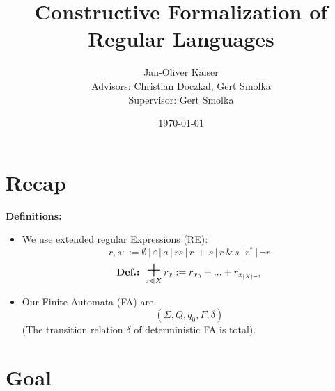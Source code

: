 \documentclass{beamer}
\DeclareMathOperator*{\bigplus}{\mbox{\huge +}}
\begin{document}
\title{Constructive Formalization of Regular Languages}  
\author[Jan-Oliver Kaiser]{Jan-Oliver Kaiser \\{\small Advisors: Christian Doczkal, Gert Smolka }\\{\small Supervisor: Gert Smolka}}

\date{\today} 


\begin{frame}
    \titlepage
\end{frame}

\begin{frame}
    \tableofcontents
\end{frame}


\section*{Recap}
\begin{frame}
    \textbf{Definitions:} \\

    \begin{itemize}
        \item 
            We use extended regular Expressions (RE):
            \[    
                r, s ::= \emptyset \, | \, \varepsilon \, | \,  a \, | \, rs \, | \,  r \,  + \, s \, | \, r \, \& \, s \, |\, r^* \, | \, \neg r
            \]
            \[
            \mbox{\textbf{Def.:} }  \bigplus_{x \in X} r_x := r_{x_0} + ... + r_{x_{|X|-1}}
            \]

        \item 
            Our Finite Automata (FA) are
            \[
                (\Sigma, Q, q_0, F, \delta)
            \]
            (The transition relation $\delta$ of deterministic FA is total).
    \end{itemize}
\end{frame}

\section{Goal}
\end{document}
